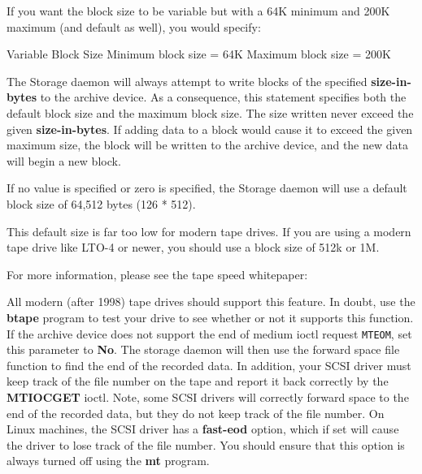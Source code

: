 \begin{description}
If you want the  block size to be variable but with a 64K minimum and 200K
maximum (and  default as well), you would specify:

\begin{bconfig}{Variable Block Size}
Minimum block size =  64K
Maximum block size = 200K
\end{bconfig}


The Storage daemon will always attempt to
write blocks of the specified {\bf size-in-bytes} to the archive device.
As a consequence, this statement specifies both the default block size
and the maximum block size.  The size written never exceed the given
{\bf size-in-bytes}.  If adding data to a block would cause it to exceed
the given maximum size, the block will be written to the archive device,
and the new data will begin a new block.

If no value is specified or zero is specified, the Storage daemon will
use a default block size of 64,512 bytes (126 * 512).

This default size is far too low for modern tape drives. If you
are using a modern tape drive like LTO-4 or newer, you should use
a block size of 512k or 1M.

For more information, please see the tape speed whitepaper:




All modern (after 1998) tape drives should support this
feature. In doubt, use the {\bf btape} program  to test your drive to see whether or not it
supports this function.
If the archive device does not support the end of medium
ioctl request {\tt MTEOM}, set this parameter to {\bf No}.
The storage daemon will then use the forward space file
function to find the end of the recorded data.
In addition, your SCSI driver must
keep track of the file number on the tape and report it back correctly by
the {\bf MTIOCGET} ioctl. Note, some SCSI drivers will correctly forward
space to the end of the recorded data, but they do not keep track of the
file number.  On Linux machines, the SCSI driver has a {\bf fast-eod}
option, which if set will cause the driver to lose track of the file
number. You should ensure that this option is always turned off using the
{\bf mt} program.


\end{description}
